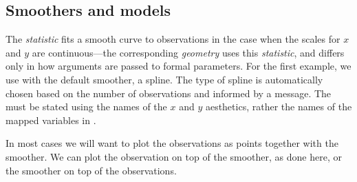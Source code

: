 \documentclass[krantz2]{krantz}\usepackage{knitr}
\begin{document}
\subsection{Smoothers and models}\label{sec:plot:smoothers}
The \emph{statistic}  fits a smooth curve to observations in the case when the scales for $x$ and $y$ are continuous---the corresponding \emph{geometry}  uses this \emph{statistic}, and differs only in how arguments are passed to formal parameters. For the first example, we use  with the default smoother, a spline. The type of spline is automatically chosen based on the number of observations and informed by a message. The  must be stated using the names of the $x$ and $y$ aesthetics, rather the names of the mapped variables in .

\begin{knitrout}\footnotesize
{}\color{fgcolor}\begin{kframe}
\begin{alltt}
\hlstd{(}  \hlstd{(}    \hlopt{+}
       \hlstd{(}  \hlopt{~} 
\end{alltt}
\end{kframe}
\end{knitrout}

In most cases we will want to plot the observations as points together with the smoother. We can plot the observation on top of the smoother, as done here, or the smoother on top of the observations.
\end{document}
